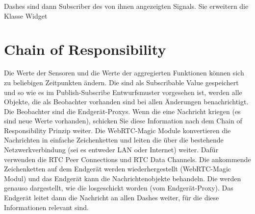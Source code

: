 \documentclass[entwurf.tex]{subfiles}
\begin{document}
Dashes sind dann Subscriber des von ihnen angezeigten Signals. Sie erweitern die Klasse Widget
\section{Chain of Responsibility}

Die Werte der Sensoren und die Werte der aggregierten Funktionen können sich zu beliebigen Zeitpunkten ändern. Die sind als Subscribable Value gespeichert und so wie es im Publish-Subscribe Entwurfsmuster vorgesehen ist, werden alle Objekte, die als Beobachter vorhanden sind bei allen Änderungen benachrichtigt. Die Beobachter sind die Endgerät-Proxys. Wenn die eine Nachricht kriegen (es sind neue Werte vorhanden), schicken Sie diese Information nach dem Chain of Responsibility Prinzip weiter. Die WebRTC-Magic Module konvertieren die Nachrichten in einfache Zeichenketten und leiten die über die bestehende Netzwerkverbindung (sei es entweder LAN oder Internet) weiter. Dafür verwenden die RTC Peer Connections und RTC Data Channels. Die ankommende Zeichenketten auf dem Endgerät werden wiederhergestellt (WebRTC-Magic Modul) und das Endgerät kann die Nachrichtenobjekte behandeln. Die werden genauso dargestellt, wie die losgeschickt worden (vom Endgerät-Proxy). Das Endgerät leitet dann die Nachricht an allen Dashes weiter, für die diese Informationen relevant sind.
\end{document}
